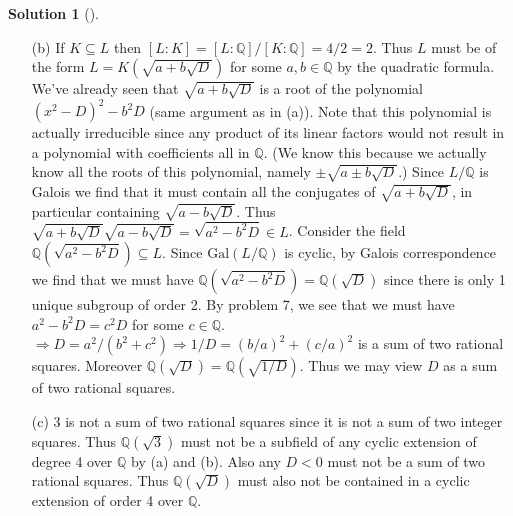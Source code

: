 \documentclass{article}
\theoremstyle{definition}
\newtheorem*{sol}{Solution}
\newenvironment{sols}[1][]{%
  \begin{sol}[#1]$ $\par\nobreak\ignorespaces
}{%
  \end{sol}
}
\newcommand{\QQ}{\mathbb Q}
\newcommand{\Ra}{\Rightarrow}
\newcommand{\Gal}{\text{Gal}}
\begin{document}
\begin{sols}
\begin{enumerate}
		\item[(b)] If $K \subseteq L$ then $[L:K] = [L:\QQ]/[K:\QQ] = 4/2 = 2$.
			Thus $L$ must be of the form $L = K(\sqrt{a + b \sqrt{D}})$ for some $a, b \in \QQ$ by the quadratic formula.
			We've already seen that $\sqrt{a + b \sqrt{D}}$ is a root of the polynomial $(x^2 - D)^2 - b^2D$ (same argument as in (a)).
			Note that this polynomial is actually irreducible since any product of its linear factors would not result in a polynomial with coefficients all in $\QQ$. 
			(We know this because we actually know all the roots of this polynomial, namely $\pm \sqrt{a \pm b \sqrt{D}}$.)
			Since $L/\QQ$ is Galois we find that it must contain all the conjugates of $\sqrt{a + b \sqrt{D}}$, in particular containing $\sqrt{a - b \sqrt{D}}$.
			Thus $\sqrt{a + b \sqrt{D}} \sqrt{a - b \sqrt{D}} = \sqrt{a^2 - b^2 D} \in L$.
			Consider the field $\QQ(\sqrt{a^2 - b^2 D}) \subseteq L$.
			Since $\Gal(L/\QQ)$ is cyclic, by Galois correspondence we find that we must have $\QQ(\sqrt{a^2 - b^2 D}) = \QQ(\sqrt{D})$ since there is only 1 unique subgroup of order 2.
			By problem 7, we see that we must have $a^2 - b^2 D = c^2 D$ for some $c \in \QQ$.
			$\Ra D = a^2 /(b^2 + c^2) \Ra 1/D = (b/a)^2 + (c/a)^2$ is a sum of two rational squares.
			Moreover $\QQ(\sqrt{D}) = \QQ(\sqrt{1/D})$.
			Thus we may view $D$ as a sum of two rational squares.

		\item[(c)] 3 is not a sum of two rational squares since it is not a sum of two integer squares.
			Thus $\QQ(\sqrt{3})$ must not be a subfield of any cyclic extension of degree 4 over $\QQ$ by (a) and (b).
			Also any $D < 0$ must not be a sum of two rational squares.
			Thus $\QQ(\sqrt{D})$ must also not be contained in a cyclic extension of order 4 over $\QQ$.

	\end{enumerate}
\end{sols}
\end{document}
